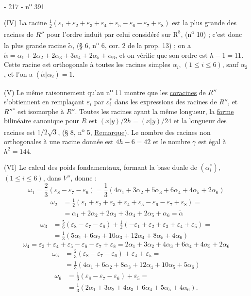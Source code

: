 - 217 - \hfill n\textsuperscript{o} 391

(IV) La racine $\frac12(\varepsilon_1+\varepsilon_2+\varepsilon_3+\varepsilon_4+\varepsilon_5-\varepsilon_6-\varepsilon_7+\varepsilon_8)$ est la plus grande des racines de $R''$ pour l'ordre induit par celui considéré sur $\mathrm R^8$, (n\textsuperscript{o} 10) ; c'est donc la plus grande racine $\widetilde\alpha$, (§ 6, n\textsuperscript{o} 6, cor. 2 de la prop. 13) ; on a $\widetilde\alpha=\alpha_1+2\alpha_2+2\alpha_3+3\alpha_4+2\alpha_5+\alpha_6$, et on vérifie que son ordre est $h-1=11$. Cette racine est orthogonale à toutes les racines simples $\alpha_i$, $(1\leq i\leq6)$, sauf $\alpha_2$, et l'on a $(\widetilde\alpha|\alpha_2)=1$.

(V) Le même raisonnement qu'au n\textsuperscript{o} 11 montre que les \uline{coracines} de $R''$ s'obtiennent en remplaçant $\varepsilon_i$ par $\varepsilon_i^*$ dans les expressions des racines de $R''$, et $R''{}^*$ est isomorphe à $R''$. Toutes les racines ayant la même longueur, la \uline{forme bilinéaire canonique} pour $R$ est $(x|y)/2h=(x|y)/24$ et la longueur des racines est $1/2\sqrt3$, (§ 8, n\textsuperscript{o} 5, \uline{Remarque}). Le nombre des racines non orthogonales à une racine donnée est $4h-6=42$ et le nombre $\gamma$ est égal à $h^2=144$.

(VI) Le calcul des poids fondamentaux, formant la base duale de $(\alpha_i^*)$, $(1\leq i\leq6)$, dans $V''$, donne :
\[
\omega_1=\frac23(\varepsilon_8-\varepsilon_7-\varepsilon_6)=\frac13(4\alpha_1+3\alpha_2+5\alpha_3+6\alpha_4+4\alpha_5+2\alpha_6)
\]
\[
\begin{aligned}
\omega_2&=\frac12(\varepsilon_1+\varepsilon_2+\varepsilon_3+\varepsilon_4+\varepsilon_5-\varepsilon_6-\varepsilon_7+\varepsilon_8)=\\
&=\alpha_1+2\alpha_2+2\alpha_3+3\alpha_4+2\alpha_5+\alpha_6=\widetilde\alpha
\end{aligned}
\]
\[
\begin{aligned}
\omega_3&=\frac56(\varepsilon_8-\varepsilon_7-\varepsilon_6)+\frac12(-\varepsilon_1+\varepsilon_2+\varepsilon_3+\varepsilon_4+\varepsilon_5)=\\
&=\frac13(5\alpha_1+6\alpha_2+10\alpha_3+12\alpha_4+8\alpha_5+4\alpha_6)
\end{aligned}
\]
\[
\omega_4=\varepsilon_3+\varepsilon_4+\varepsilon_5-\varepsilon_6-\varepsilon_7+\varepsilon_8=2\alpha_1+3\alpha_2+4\alpha_3+6\alpha_4+4\alpha_5+2\alpha_6
\]
\[
\begin{aligned}
\omega_5&=\frac23(\varepsilon_8-\varepsilon_7-\varepsilon_6)+\varepsilon_4+\varepsilon_5=\\
&=\frac13(4\alpha_1+6\alpha_2+8\alpha_3+12\alpha_4+10\alpha_5+5\alpha_6)
\end{aligned}
\]
\[
\begin{aligned}
\omega_6&=\frac13(\varepsilon_8-\varepsilon_7-\varepsilon_6)+\varepsilon_5=\\
&=\frac13(2\alpha_1+3\alpha_2+4\alpha_3+6\alpha_4+5\alpha_5+4\alpha_6).
\end{aligned}
\]
